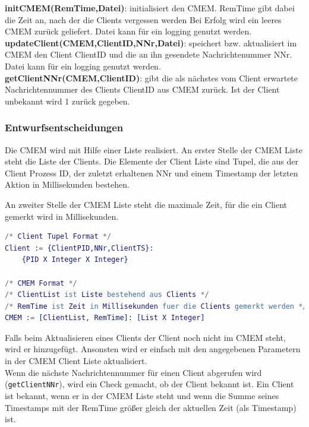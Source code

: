\documentclass{article}
\begin{document}
\textbf{initCMEM(RemTime,Datei)}: initialisiert den CMEM. RemTime gibt dabei die Zeit an, nach der die Clients vergessen werden Bei Erfolg wird ein leeres CMEM zurück geliefert. Datei kann für ein logging genutzt werden.\\

\textbf{updateClient(CMEM,ClientID,NNr,Datei)}: speichert bzw. aktualisiert im CMEM den Client ClientID und die an ihn gesendete Nachrichtenummer NNr. Datei kann für ein logging genutzt werden.\\

\textbf{getClientNNr(CMEM,ClientID)}: gibt die als nächstes vom Client erwartete Nachrichtennummer des Clients ClientID aus CMEM zurück. Ist der Client unbekannt wird 1 zurück gegeben.\\

\subsubsection{Entwurfsentscheidungen}
Die CMEM wird mit Hilfe einer Liste realisiert. An erster Stelle der CMEM Liste steht die Liste der Clients. Die Elemente der Client Liste sind Tupel, die aus der Client Prozess ID, der zuletzt erhaltenen NNr und einem Timestamp der letzten Aktion in Millisekunden bestehen.

An zweiter Stelle der CMEM Liste steht die maximale Zeit, für die ein Client gemerkt wird in Millisekunden.

\begin{lstlisting}[language=erlang]
/* Client Tupel Format */
Client := {ClientPID,NNr,ClientTS}:
    {PID X Integer X Integer}

/* CMEM Format */
/* ClientList ist Liste bestehend aus Clients */
/* RemTime ist Zeit in Millisekunden fuer die Clients gemerkt werden */
CMEM := [ClientList, RemTime]: [List X Integer]
\end{lstlisting}

Falls beim Aktualisieren eines Clients der Client noch nicht im CMEM steht, wird er hinzugefügt.
Ansonsten wird er einfach mit den angegebenen Parametern in der CMEM Client Liste aktualisiert.\\

Wenn die nächste Nachrichtennummer für einen Client abgerufen wird (\texttt{getClientNNr}), wird ein Check gemacht, ob der Client bekannt ist.
Ein Client ist bekannt, wenn er in der CMEM Liste steht und wenn die Summe seines Timestamps mit der RemTime größer gleich der aktuellen Zeit (als Timestamp) ist.\\
\end{document}

